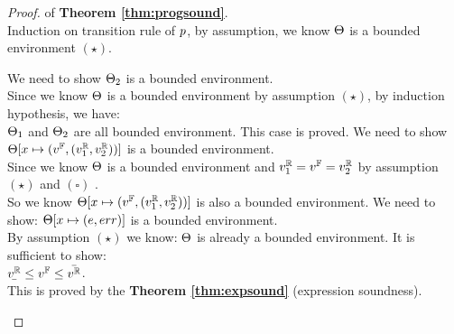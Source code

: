 \documentclass[a4paper,11pt]{article}
\begin{document}
\begin{proof} of \textbf{Theorem \ref{thm:progsound}}.
%
\\
%
Induction on transition rule of $p$, by assumption, we know $\Theta$ is a bounded environment $(\star)$.
\begin{itemize}
	We need to show $\Theta_2$ is a bounded environment.\\
	Since we know $\Theta$ is a bounded environment by assumption $(\star)$, by induction hypothesis, we have:
	\\
	$\Theta_1$ and $\Theta_2$ are all bounded environment. This case is proved.
%
	\caseL{\[
	\inferrule*[right = sample]
	{
		 \fval \leftarrow \edistr^{\diamond}
		 \and
	 	\rval_1 = \fval = \rval_2 ~ (\square)
	}
	{
		\trsenv, \varx \samplel \edistr
		\trsto
		\trsenv[\varx \mapsto (\fval, (\rval_1, \rval_2))]
	}
	\]}
	We need to show $\Theta[x \mapsto (v^{\mathbb{F}}, (v^{\mathbb{R}}_1, v^{\mathbb{R}}_2))]$ is a bounded environment.\\
	Since we know $\Theta$ is a bounded environment and $v^{\mathbb{R}}_1 = v^{\mathbb{F}} =v^{\mathbb{R}}_2$ by assumption $(\star)$ and $(\square)$ .
	\\
	So we know $\Theta[x \mapsto (v^{\mathbb{F}}, (v^{\mathbb{R}}_1, v^{\mathbb{R}}_2))]$ is also a bounded environment.
%
	\caseL{\[
	\inferrule*[right = asg]
	{
		\trsenv, \expr \trsto (\fval, (\ubar{\rval}, \bar{\rval}) )
	}
	{
		\trsenv, \varx = \expr
		\trsto
		\trsenv[\varx \mapsto (\fval, (\ubar{\rval}, \bar{\rval}) )]
	}
	\]}
	We need to show: $\Theta[x \mapsto (e, err )]$ is a bounded environment.\\
	By assumption $(\star)$ we know: $\Theta$ is already a bounded environment. It is sufficient to show:\\
	$\ubar{\rval} \leq \fval \leq \bar{\rval}$.\\
	This is proved by the \textbf{Theorem \ref{thm:expsound}} (expression soundness).
\end{itemize}
\end{proof}
%
%
\end{document}
